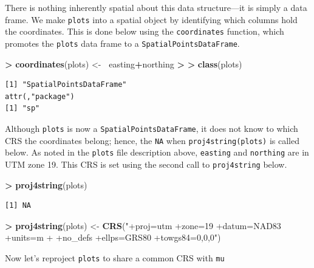 \documentclass[]{krantz}
\makeatletter
\newenvironment{Shaded}{\begin{snugshade}}{\end{snugshade}}
\newcommand{\ErrorTok}[1]{\textcolor[rgb]{0.14,0.14,0.14}{\textbf{#1}}}
\newcommand{\KeywordTok}[1]{\textcolor[rgb]{0.27,0.27,0.27}{\textbf{#1}}}
\newcommand{\NormalTok}[1]{#1}
\newcommand{\OperatorTok}[1]{\textcolor[rgb]{0.43,0.43,0.43}{\textbf{#1}}}
\newcommand{\StringTok}[1]{\textcolor[rgb]{0.5,0.5,0.5}{#1}}
\newenvironment{kframe}{%
\medskip{}
\setlength{\fboxsep}{.8em}
 \def\at@end@of@kframe{}%
 \ifinner\ifhmode%
  \def\at@end@of@kframe{\end{minipage}}%
  \begin{minipage}{\columnwidth}%
 \fi\fi%
 \def\FrameCommand##1{\hskip\@totalleftmargin \hskip-\fboxsep
 \colorbox{shadecolor}{##1}\hskip-\fboxsep
     \hskip-\linewidth \hskip-\@totalleftmargin \hskip\columnwidth}%
 \MakeFramed {\advance\hsize-\width
   \@totalleftmargin\z@ \linewidth\hsize
   \@setminipage}}%
 {\par\unskip\endMakeFramed%
 \at@end@of@kframe}
\renewenvironment{Shaded}{\begin{kframe}}{\end{kframe}}
\makeatother
\begin{document}
There is nothing inherently spatial about this data structure---it is simply a data frame. We make \texttt{plots} into a spatial object by identifying which columns hold the coordinates. This is done below using the \texttt{coordinates} function, which promotes the \texttt{plots} data frame to a \texttt{SpatialPointsDataFrame}.

\begin{Shaded}
\begin{Highlighting}[]
\OperatorTok{>}\StringTok{ }\KeywordTok{coordinates}\NormalTok{(plots) <-}\StringTok{ }\ErrorTok{~}\NormalTok{easting}\OperatorTok{+}\NormalTok{northing}
\OperatorTok{>}\StringTok{ }
\ErrorTok{>}\StringTok{ }\KeywordTok{class}\NormalTok{(plots)}
\end{Highlighting}
\end{Shaded}

\begin{verbatim}
[1] "SpatialPointsDataFrame"
attr(,"package")
[1] "sp"
\end{verbatim}

Although \texttt{plots} is now a \texttt{SpatialPointsDataFrame}, it does not know to which CRS the coordinates belong; hence, the \texttt{NA} when \texttt{proj4string(plots)} is called below. As noted in the \texttt{plots} file description above, \texttt{easting} and \texttt{northing} are in UTM zone 19. This CRS is set using the second call to \texttt{proj4string} below.

\begin{Shaded}
\begin{Highlighting}[]
\OperatorTok{>}\StringTok{ }\KeywordTok{proj4string}\NormalTok{(plots)}
\end{Highlighting}
\end{Shaded}

\begin{verbatim}
[1] NA
\end{verbatim}

\begin{Shaded}
\begin{Highlighting}[]
\OperatorTok{>}\StringTok{ }\KeywordTok{proj4string}\NormalTok{(plots) <-}\StringTok{ }\KeywordTok{CRS}\NormalTok{(}\StringTok{"+proj=utm +zone=19 +datum=NAD83 +units=m }
\StringTok{+                              +no_defs +ellps=GRS80 +towgs84=0,0,0"}\NormalTok{)                   }
\end{Highlighting}
\end{Shaded}

Now let's reproject \texttt{plots} to share a common CRS with \texttt{mu}
\end{document}
